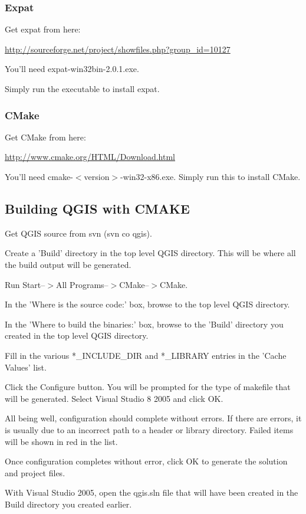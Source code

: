 \subsubsection{Expat}
Get expat from here:

\url{http://sourceforge.net/project/showfiles.php?group\_id=10127}

You'll need expat-win32bin-2.0.1.exe.

Simply run the executable to install expat.

\subsubsection{CMake}
Get CMake from here:


\url{http://www.cmake.org/HTML/Download.html}

You'll need cmake-$<$version$>$-win32-x86.exe. Simply run this to install CMake.

\subsection{Building QGIS with CMAKE}
Get QGIS source from svn (svn co  qgis).

Create a 'Build' directory in the top level QGIS directory. This will be where all the build output will be generated.

Run Start--$>$All Programs--$>$CMake--$>$CMake. 

In the 'Where is the source code:' box, browse to the top level QGIS directory.

In the 'Where to build the binaries:' box, browse to the 'Build' directory you created in the top level QGIS directory.

Fill in the various *\_INCLUDE\_DIR and *\_LIBRARY entries in the 'Cache Values' list.

Click the Configure button. You will be prompted for the type of makefile that will be generated. Select Visual Studio 8 2005 and click OK.

All being well, configuration should complete without errors. If there are errors, it is usually due to an incorrect path to a header or library directory. Failed items will be shown in red in the list.

Once configuration completes without error, click OK to generate the solution and project files.

With Visual Studio 2005, open the qgis.sln file that will have been created in the Build directory you created earlier.


